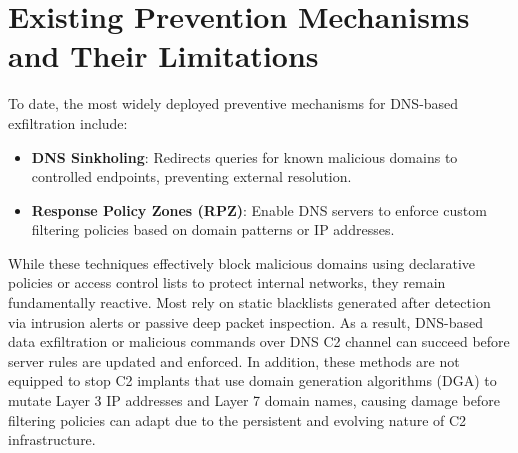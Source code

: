 \documentclass [11pt, proquest] {uwthesis}[2020/02/24]
\begin{document}
\section{Existing Prevention Mechanisms and Their Limitations}
To date, the most widely deployed preventive mechanisms for DNS-based exfiltration include:
\begin{itemize}
\item \textbf{DNS Sinkholing}: Redirects queries for known malicious domains to controlled endpoints, preventing external resolution.
\item \textbf{Response Policy Zones (RPZ)}: Enable DNS servers to enforce custom filtering policies based on domain patterns or IP addresses.
\end{itemize}
While these techniques effectively block malicious domains using declarative policies or access control lists to protect internal networks, they remain fundamentally reactive. Most rely on static blacklists generated after detection via intrusion alerts or passive deep packet inspection. As a result, DNS-based data exfiltration or malicious commands over DNS C2 channel can succeed before server rules are updated and enforced. In addition, these methods are not equipped to stop C2 implants that use domain generation algorithms (DGA) to mutate Layer 3 IP addresses and Layer 7 domain names, causing damage before filtering policies can adapt due to the persistent and evolving nature of C2 infrastructure.


\end{document}
